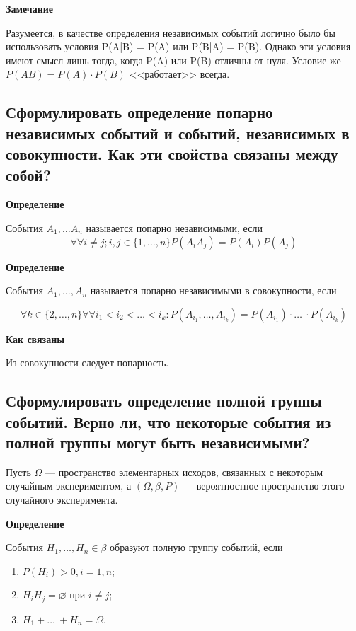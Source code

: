 \textbf{Замечание}

Разумеется, в качестве определения независимых событий логично было бы использовать условия P(A|B) = P(A) или P(B|A) = P(B). Однако эти условия имеют смысл лишь тогда, когда P(A) или P(B) отличны от нуля. Условие же $P(AB) = P(A) \cdot P(B)$ <<работает>> всегда.

\subsection{Сформулировать определение попарно независимых событий и событий, независимых в совокупности. Как эти свойства связаны между собой?}

\textbf{Определение}

События $A_1, \dots A_n$ называется попарно независимыми, если
\begin{equation}
	\forall \forall i \neq j; i,j \in \{1, \dots, n\} P(A_i A_j) = P(A_i)P(A_j)
\end{equation}


\textbf{Определение}

События $A_1, \dots , A_n$ называется попарно независимыми в совокупности, если

\begin{equation}
	\forall k \in \{2, \dots, n\} \forall \forall i_1 < i_2 < \dots < i_k: P(A_{i_1}, \dots, A_{i_k}) = P(A_{i_1}) \cdot \dots\ \cdot P(A_{i_k})
\end{equation}

\textbf{Как связаны}

Из совокупности следует попарность.


\subsection{Сформулировать определение полной группы событий. Верно ли, что некоторые события из полной группы могут быть независимыми?}

Пусть $\Omega$ --- пространство элементарных исходов, связанных с некоторым случайным экспериментом, а $(\Omega, \beta, P)$ --- вероятностное пространство этого случайного эксперимента.

\textbf{Определение}

События $H_1, \dots, H_n \in \beta$ образуют полную группу событий, если

\begin{enumerate}
	\item $P(H_i) > 0, i = 1, n$;
	\item $H_iH_j = \varnothing$ при $i \neq j$;
	\item $H_1 + \dots\ + H_n = \Omega$.
\end{enumerate}

